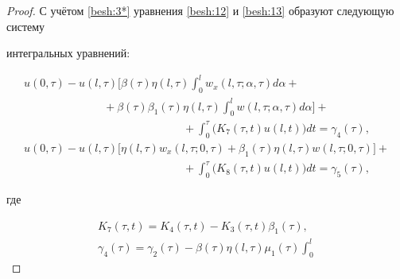 \begin{proof}

С учётом \eqref{besh:3*} уравнения \eqref{besh:12} и \eqref{besh:13} образуют следующую систему

интегральных уравнений:

\begin{equation}

\begin{array}{l}

\displaystyle u(0,\tau)-u(l,\tau)\Big[\beta(\tau)\eta(l,\tau)\int^{l}_{0}

w_{x}(l,\tau;\alpha,\tau)d\alpha +

\\

\hspace{3cm}

\displaystyle 

 + \beta(\tau)\beta_{1}(\tau)\eta(l,\tau)\int^{l}_{0}

w(l,\tau;\alpha,\tau)d\alpha \Big] +

\\

\hspace{6cm}

\displaystyle 

+\int^{\tau}_0\Big(K_{7}(\tau,t)u(l,t)\Big)dt=\gamma_{4}(\tau),

\\

\displaystyle u(0,\tau)-u(l,\tau)\Big[\eta(l,\tau)w_{x}(l,\tau;0,\tau)+

\beta_{1}(\tau)\eta(l,\tau)w(l,\tau;0,\tau)\Big]+

\\

\hspace{6cm}

\displaystyle +\int^{\tau}_0\Big(K_{8}(\tau,t)u(l,t)\Big)dt=\gamma_{5}(\tau),

\end{array}

\label{besh:17}

\end{equation}

где

\begin{gather*}

K_{7}(\tau,t)=K_{4}(\tau,t)-K_{3}(\tau,t)\beta_{1}(\tau),

\\

\gamma_{4}(\tau)=\gamma_{2}(\tau)-\beta(\tau)\eta(l,\tau)\mu_{1}(\tau)\int^{l}_{0}


\end{gather*}
\end{proof}
